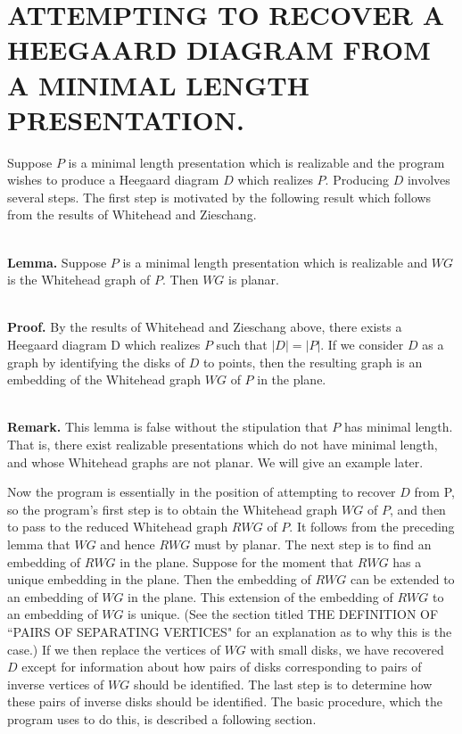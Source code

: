 \documentclass[12pt]{amsart}
\newcommand{\lemma}{\ \\ \noindent  \textbf{Lemma.} }
\newcommand{\remark}{\ \\ \noindent \textbf{Remark.} }
\newcommand{\pf}{\ \\ \noindent \textbf{Proof.} }
\begin{document}
\section{ATTEMPTING TO RECOVER A HEEGAARD DIAGRAM FROM A MINIMAL LENGTH PRESENTATION.}
                
                Suppose $P$ is a minimal length presentation which is realizable and the program
        wishes to produce a Heegaard diagram $D$ which realizes $P$. Producing $D$ involves several
        steps. The first step is motivated by the following result which follows from the
        results of Whitehead and Zieschang.
        
\lemma  Suppose $P$ is a minimal length presentation which is realizable and $WG$ is the
        Whitehead graph of $P$. Then $WG$ is planar.
        
\pf   By the results of Whitehead and Zieschang above, there exists a Heegaard diagram
        D which realizes $P$ such that $|D| = |P|$. If we consider $D$ as a graph by identifying 
        the disks of $D$ to points, then the resulting graph is an embedding of the Whitehead
        graph $WG$ of $P$ in the plane.

\remark This lemma is false without the stipulation that $P$ has minimal length. That is,
        there exist realizable presentations which do not have minimal length, and whose
        Whitehead graphs are not planar. We will give an example later. 
                
                Now the program is essentially in the position of attempting to recover $D$ from
        P, so the program's first step is to obtain the Whitehead graph $WG$ of $P$, and then
        to pass to the reduced Whitehead graph $RWG$ of $P$. It follows from the preceding lemma
        that $WG$ and hence $RWG$ must by planar. The next step is to find an embedding of $RWG$ in
        the plane. Suppose for the moment that $RWG$ has a unique embedding in the plane. Then
        the embedding of $RWG$ can be extended to an embedding of $WG$ in the plane. This extension
        of the embedding of $RWG$ to an embedding of $WG$ is unique. (See the section titled
        THE DEFINITION OF  ``PAIRS OF SEPARATING VERTICES" for an explanation as to why this is
        the case.) If we then replace the vertices of $WG$ with small disks, we have recovered $D$
        except for information about how pairs of disks corresponding to pairs of inverse
        vertices of $WG$ should be identified. The last step is to determine how these pairs of
        inverse disks should be identified. The basic procedure, which the program uses to do
        this, is described a following section.
\end{document}
